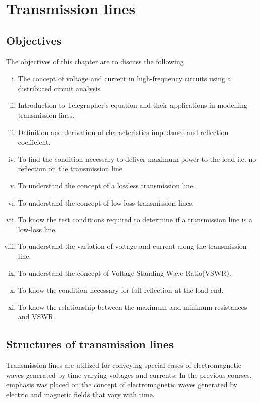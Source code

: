 \chapter{Transmission lines}\label{lec:lec2}

\begin{mdframed}[backgroundcolor=lightblue, linewidth=1pt, hidealllines=true]
\section{Objectives}
The objectives of this chapter are to discuss the following
\begin{enumerate}[(i)]
\item The concept of voltage and current in high-frequency circuits using a distributed circuit analysis
\item Introduction to Telegrapher's equation and their applications in modelling transmission lines.
\item Definition and derivation of characteristics impedance and reflection coefficient.
\item To find the condition necessary to deliver maximum power to the load i.e. no reflection on the transmission line.
\item To understand the concept of a lossless transmission line.
\item To understand the concept of low-loss transmission lines.
\item To know the test conditions required to determine if a transmission line is a low-loss line.
\item To understand the variation of voltage and current along the transmission line.
\item To understand the concept of Voltage Standing Wave Ratio(VSWR).
\item To know the condition necessary for full reflection at the load end.
\item To know the relationship between the maximum and minimum resistances and VSWR. 
\end{enumerate}
\end{mdframed}

\section{Structures of transmission lines}
Transmission lines are utilized for conveying special cases of electromagnetic waves generated by time-varying voltages and currents. In the previous courses, emphasis was placed on the concept of electromagnetic waves generated by electric and magnetic fields that vary with time.

